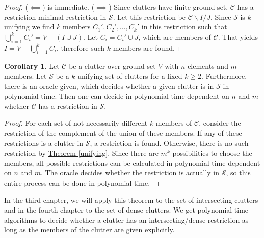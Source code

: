 \documentclass[a4paper, 12pt]{scrbook}
\theoremstyle{definition}
\newtheorem{corollary}[theorem]{Corollary}
\begin{document}
   \begin{proof}
       ($\impliedby$) is immediate.
       ($\implies$) Since clutters have finite ground set, $\mathcal{C}$ has a restriction-minimal restriction in $\mathcal{S}$.
       Let this restriction be $\mathcal{C}\backslash I / J$.
       Since $\mathcal{S}$ is $k$-unifying we find $k$ members $C_1', C_2', \ldots, C_k'$ in this restriction such that $\bigcup_{i=1}^k C_i' = V - (I \cup J)$.
       Let $C_i = C_i' \cup J$, which are members of $\mathcal{C}$.
       That yields $I=V-\bigcup_{i=1}^k C_i$, therefore such $k$ members are found.
   \end{proof}
   \begin{corollary}
       Let $\mathcal{C}$ be a clutter over ground set $V$ with $n$ elements and $m$ members.
       Let $\mathcal{S}$ be a $k$-unifying set of clutters for a fixed $k\geq 2$.
       Furthermore, there is an oracle given, which decides whether a given clutter is in $\mathcal{S}$ in polynomial time.
       Then one can decide in polynomial time dependent on $n$ and $m$ whether $\mathcal{C}$ has a restriction in $\mathcal{S}$.
   \end{corollary}

   \begin{proof}
       For each set of not necessarily different $k$ members of $\mathcal{C}$, consider the restriction of the complement of the union of these members.
       If any of these restrictions is a clutter in $\mathcal{S}$, a restriction is found.
       Otherwise, there is no such restriction by \hyperref[unifying]{Theorem \ref*{unifying}}.
       Since there are $m^k$ possibilities to choose the members, all possible restrictions can be calculated in polynomial time dependent on $n$ and $m$. The oracle decides whether the restriction is actually in $\mathcal{S}$, so this entire process can be done in polynomial time.
   \end{proof}

   In the third chapter, we will apply this theorem to the set of intersecting clutters and in the fourth chapter to the set of dense clutters.
   We get polynomial time algorithms to decide whether a clutter has an intersecting/dense restriction as long as the members of the clutter are given explicitly.
\end{document}
